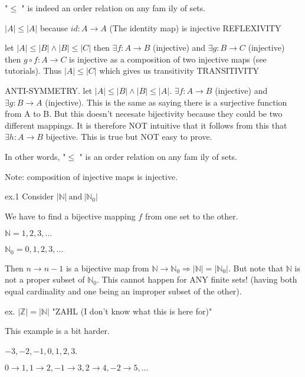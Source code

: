 \documentclass[class=scrartcl, crop=false]{standalone}
\begin{document}
"$\leq$ " is indeed an order relation on any fam ily of sets.

$|A| \leq |A|$ because $id: A \to A$ (The identity map) is injective REFLEXIVITY

let $|A| \leq |B| \wedge |B| \leq |C|$ then $\exists f:A \to B$ (injective) and $\exists g: B \to C$ (injective) then $g \circ f: A \to C$ is injective as a composition of two injective maps (see tutorials). Thus $|A| \leq |C|$ which gives us transitivity TRANSITIVITY

ANTI-SYMMETRY. let $|A| \leq |B| \wedge |B| \leq |A|$. $\exists f: A \to B$ (injective) and $\exists g: B \to A$ (injective). This is the same as saying there is a surjective function from A to B. But this doesn't necesate bijectivity because they could be two different mappings. It is therefore NOT intuitive that it follows from this that $\exists h: A \to B$ bijective. This is true but NOT easy to prove.


In other words, "$\leq$ " is an order relation on any fam ily of sets.

Note: composition of injective maps is injective.

ex.1 Consider $|\mathbb{N}| \ \text{and} \ |\mathbb{N}_0|$

We have to find a bijective mapping $f$ from one set to the other.

$\mathbb{N} = 1, 2, 3, \dots$

$\mathbb{N}_0 = 0, 1, 2, 3, \dots$

Then  $n \to n - 1$ is a bijective map from $\mathbb{N} \to \mathbb{N}_0 \Rightarrow |\mathbb{N}| = |\mathbb{N}_0|$. But note that $\mathbb{N}$ is not a proper subset of $\mathbb{N}_0$. This cannot happen for ANY finite sets! (having both equal cardinality and one being an improper subset of the other).

ex. $|\mathbb{Z}| = |\mathbb{N}|$ "ZAHL (I don't know what this is here for)"

This example is a bit harder.

 $-3, -2, -1, 0, 1, 2, 3$.

 $0 \to 1, 1 \to 2, -1 \to 3, 2 \to 4, -2 \to 5, \dots$
\end{document}
